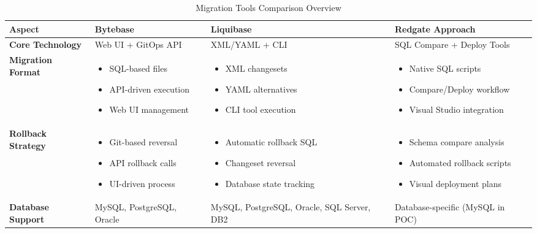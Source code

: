 \documentclass[11pt,a4paper]{article}
\begin{document}
\begin{table}[H]
\centering
\caption{Migration Tools Comparison Overview}
\begin{tabular}{|p{3cm}|p{4cm}|p{4cm}|p{4cm}|}
\hline
\textbf{Aspect} & \textbf{\textcolor{bytebase}{Bytebase}} & \textbf{\textcolor{liquibase}{Liquibase}} & \textbf{\textcolor{redgate}{Redgate Approach}} \\
\hline
\textbf{Core Technology} & Web UI + GitOps API & XML/YAML + CLI & SQL Compare + Deploy Tools \\
\hline
\textbf{Migration Format} & 
\begin{itemize}[nosep,leftmargin=*]
\item SQL-based files
\item API-driven execution
\item Web UI management
\end{itemize} & 
\begin{itemize}[nosep,leftmargin=*]
\item XML changesets
\item YAML alternatives
\item CLI tool execution
\end{itemize} & 
\begin{itemize}[nosep,leftmargin=*]
\item Native SQL scripts
\item Compare/Deploy workflow
\item Visual Studio integration
\end{itemize} \\
\hline
\textbf{Rollback Strategy} & 
\begin{itemize}[nosep,leftmargin=*]
\item Git-based reversal
\item API rollback calls
\item UI-driven process
\end{itemize} & 
\begin{itemize}[nosep,leftmargin=*]
\item Automatic rollback SQL
\item Changeset reversal
\item Database state tracking
\end{itemize} & 
\begin{itemize}[nosep,leftmargin=*]
\item Schema compare analysis
\item Automated rollback scripts
\item Visual deployment plans
\end{itemize} \\
\hline
\textbf{Database Support} & MySQL, PostgreSQL, Oracle & MySQL, PostgreSQL, Oracle, SQL Server, DB2 & Database-specific (MySQL in POC) \\
\hline
\end{tabular}
\end{table}
\end{document}
